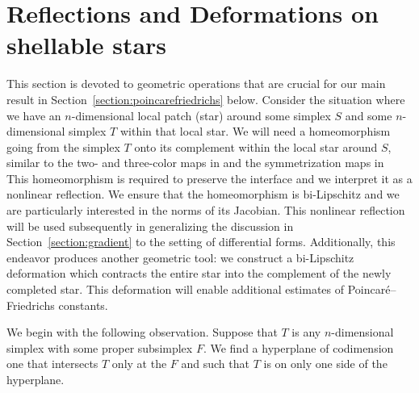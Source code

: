 \documentclass[10pt,a4paper]{article}
\begin{document}
 




















\section{Reflections and Deformations on shellable stars}\label{section:extension}

This section is devoted to geometric operations that are crucial for our main result in Section~\ref{section:poincarefriedrichs} below. 
Consider the situation where we have an $n$-dimensional local patch (star) around some simplex $S$ and some $n$-dimensional simplex $T$ within that local star. 
We will need a homeomorphism going from the simplex $T$ onto its complement within the local star around $S$,
similar to the two- and three-color maps in \cite[Sections~5.3 and~6.3]{ern2020stable} and the symmetrization maps in~\cite[Section~7.6]{Chaum_Voh_p_rob_3D_H_curl_24}
This homeomorphism is required to preserve the interface and we interpret it as a nonlinear reflection. 
We ensure that the homeomorphism is bi-Lipschitz and we are particularly interested in the norms of its Jacobian.
This nonlinear reflection will be used subsequently in generalizing the discussion in Section~\ref{section:gradient} to the setting of differential forms. 
Additionally, this endeavor produces another geometric tool:
we construct a bi-Lipschitz deformation which contracts the entire star into the complement of the newly completed star. 
This deformation will enable additional estimates of Poincar\'e--Friedrichs constants. 

We begin with the following observation. 
Suppose that $T$ is any $n$-dimensional simplex with some proper subsimplex $F$.
We find a hyperplane of codimension one that intersects $T$ only at the $F$ and such that $T$ is on only one side of the hyperplane. 
\end{document}
